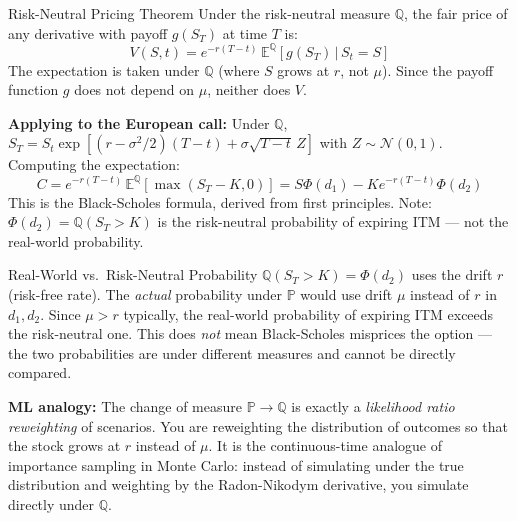 \documentclass[12pt,a4paper,openany]{report}
\theoremstyle{definition}
\newcommand{\E}{\mathbb{E}}
\begin{document}
\begin{definitionbox}{Risk-Neutral Pricing Theorem}
Under the risk-neutral measure $\mathbb{Q}$, the fair price of any derivative with payoff $g(S_T)$ at time $T$ is:
\[
  V(S, t) = e^{-r(T-t)}\,\E^{\mathbb{Q}}\!\left[g(S_T) \,\big|\, S_t = S\right]
\]
The expectation is taken under $\mathbb{Q}$ (where $S$ grows at $r$, not $\mu$). Since the payoff function $g$ does not depend on $\mu$, neither does $V$.
\end{definitionbox}

\textbf{Applying to the European call:} Under $\mathbb{Q}$, $S_T = S_t \exp\!\left[(r - \sigma^2/2)(T-t) + \sigma\sqrt{T-t}\,Z\right]$ with $Z \sim \mathcal{N}(0,1)$. Computing the expectation:
\[
  C = e^{-r(T-t)}\,\E^{\mathbb{Q}}[\max(S_T - K, 0)] = S\Phi(d_1) - Ke^{-r(T-t)}\Phi(d_2)
\]
This is the Black-Scholes formula, derived from first principles. Note: $\Phi(d_2) = \mathbb{Q}(S_T > K)$ is the risk-neutral probability of expiring ITM — not the real-world probability.

\begin{warningbox}{Real-World vs.\ Risk-Neutral Probability}
$\mathbb{Q}(S_T > K) = \Phi(d_2)$ uses the drift $r$ (risk-free rate). The \emph{actual} probability under $\mathbb{P}$ would use drift $\mu$ instead of $r$ in $d_1, d_2$. Since $\mu > r$ typically, the real-world probability of expiring ITM exceeds the risk-neutral one. This does \emph{not} mean Black-Scholes misprices the option — the two probabilities are under different measures and cannot be directly compared.
\end{warningbox}

\textbf{ML analogy:} The change of measure $\mathbb{P} \to \mathbb{Q}$ is exactly a \emph{likelihood ratio reweighting} of scenarios. You are reweighting the distribution of outcomes so that the stock grows at $r$ instead of $\mu$. It is the continuous-time analogue of importance sampling in Monte Carlo: instead of simulating under the true distribution and weighting by the Radon-Nikodym derivative, you simulate directly under $\mathbb{Q}$.
\end{document}
